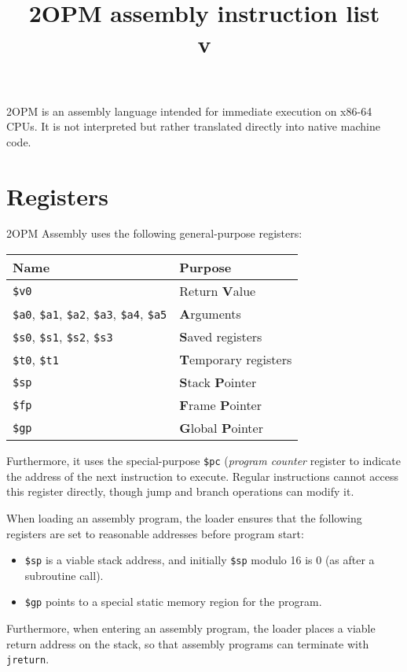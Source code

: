 \documentclass{article}
\title{2OPM assembly instruction list\\ \normalsize v}
\begin{document}
\maketitle

2OPM is an assembly language intended for immediate execution on
x86-64 CPUs. It is not interpreted but rather translated directly into
native machine code.

\section{Registers}
2OPM Assembly uses the following general-purpose registers:


  \begin{tabular}{|p{6cm}|l|}
    \hline
    \textbf{Name} & \textbf{Purpose} \\
    \hline
    \hline
    \texttt{\$v0} & Return \textbf{V}alue\\
    \texttt{\$a0}, \texttt{\$a1}, \texttt{\$a2}, \texttt{\$a3}, \texttt{\$a4}, \texttt{\$a5} & \textbf{A}rguments\\
    \texttt{\$s0}, \texttt{\$s1}, \texttt{\$s2}, \texttt{\$s3} & \textbf{S}aved registers \\
    \texttt{\$t0}, \texttt{\$t1} & \textbf{T}emporary registers \\
    \texttt{\$sp} & \textbf{S}tack \textbf{P}ointer\\
    \texttt{\$fp} & \textbf{F}rame \textbf{P}ointer\\
    \texttt{\$gp} & \textbf{G}lobal \textbf{P}ointer\\
    \hline
  \end{tabular}


Furthermore, it uses the special-purpose \texttt{\$pc} (\emph{program counter} register to indicate
the address of the next instruction to execute.  Regular instructions cannot access this register directly,
though jump and branch operations can modify it.

When loading an assembly program, the loader ensures that the following registers are set to reasonable
addresses before program start:
\begin{itemize}
  \item \texttt{\$sp} is a viable stack address, and initially \texttt{\$sp} modulo 16 is 0 (as after a subroutine call).
  \item \texttt{\$gp} points to a special static memory region for the program.
\end{itemize}
Furthermore, when entering an assembly program, the loader places a viable return address on the stack,
so that assembly programs can terminate with \texttt{jreturn}.
\end{document}
